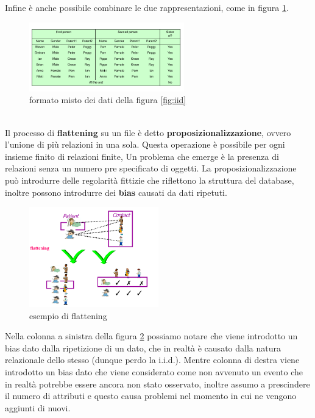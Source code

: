 \documentclass{../main.tex}[subfiles]
\begin{document}
Infine è anche possibile combinare le due rappresentazioni, come in figura \ref{fig:iid4}.
\begin{figure}
	\centering
	\includegraphics[width=0.6\textwidth]{pictures/familyComb.png}
	\caption{formato misto dei dati della figura \ref{fig:iid}}
	\label{fig:iid4}
\end{figure}\\
Il processo di \textbf{flattening} su un file è detto \textbf{proposizionalizzazione}, ovvero l'unione di più relazioni in una sola.
Questa operazione è possibile per ogni insieme finito di relazioni finite, Un problema che emerge è la presenza di relazioni senza un numero pre specificato di oggetti.
La proposizionalizzazione può introdurre delle regolarità fittizie che riflettono la struttura del database, inoltre possono introdurre dei \textbf{bias} causati da dati ripetuti.
\begin{figure}[H]
	\centering
	\includegraphics[width=0.5\textwidth]{pictures/flattening.png}
	\caption{esempio di flattening}
	\label{fig:flattening}
\end{figure}
\noindent
Nella colonna a sinistra della figura \ref{fig:flattening} possiamo notare che viene introdotto un bias dato dalla ripetizione di un dato, che in realtà è causato dalla natura relazionale dello stesso (dunque perdo la i.i.d.).
Mentre colonna di destra viene introdotto un bias dato che viene considerato come non avvenuto un evento che in realtà potrebbe essere ancora non stato osservato, inoltre assumo a prescindere il numero di attributi e questo causa problemi nel momento in cui ne vengono aggiunti di nuovi.
\end{document}
